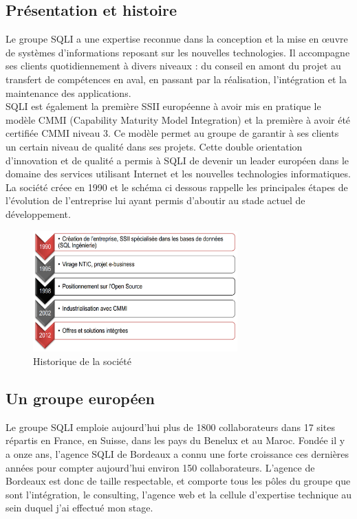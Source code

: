 \documentclass{report}
\newcommand{\jumpOne}{\\[1\baselineskip]}
\newcommand{\jumpTwo}{\\[2\baselineskip]}
\begin{document}
\subsection{Présentation et histoire}
Le groupe SQLI a une expertise reconnue dans la conception et la mise en œuvre de systèmes
d’informations reposant sur les nouvelles technologies. Il accompagne ses clients quotidiennement à
divers niveaux : du conseil en amont du projet au transfert de compétences en aval, en passant par la
réalisation, l’intégration et la maintenance des applications.
\jumpOne
SQLI est également la première SSII européenne à avoir mis en pratique le modèle CMMI
(Capability Maturity Model Integration) et la première à avoir été certifiée CMMI niveau 3. Ce
modèle permet au groupe de garantir à ses clients un certain niveau de qualité dans ses projets.
Cette double orientation d'innovation et de qualité a permis à SQLI de devenir un leader européen dans le
domaine des services utilisant Internet et les nouvelles technologies informatiques.
\jumpOne
La société créee en 1990 et le schéma ci dessous rappelle les principales étapes de l'évolution de l'entreprise lui ayant permis d'aboutir au stade actuel de développement. 
\begin{figure}[h!]
	\centering
	\includegraphics[width=0.7\textwidth]{assets/timeline.png}
	\caption{Historique de la société}
\end{figure}

\subsection{Un groupe européen}

Le groupe SQLI emploie aujourd’hui plus de 1800 collaborateurs dans 17 sites répartis en France, en
Suisse, dans les pays du Benelux et au Maroc.
Fondée il y a onze ans, l’agence SQLI de Bordeaux a connu une forte croissance ces dernières
années pour compter aujourd’hui environ 150 collaborateurs. L’agence de Bordeaux est donc de
taille respectable, et comporte tous les pôles du groupe que sont l’intégration, le consulting, l’agence web et la cellule d'expertise technique au sein duquel j’ai effectué mon stage.
\jumpTwo
\end{document}
